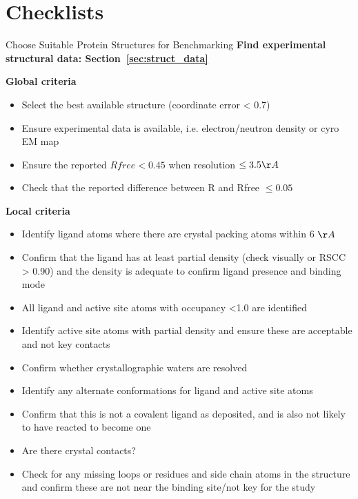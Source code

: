 \documentclass[9pt,bestpractices]{livecoms}
\begin{document}
\section{Checklists}
\label{sec:checklists}

\begin{Checklists*}

\begin{checklist}{Choose Suitable Protein Structures for Benchmarking}
\textbf{Find experimental structural data: Section~\ref{sec:struct_data}}

    \textbf{Global criteria}
    \begin{itemize}
        \item Select the best available structure (coordinate error < 0.7)
        \item Ensure experimental data is available, i.e. electron/neutron density or cyro EM map
        \item Ensure the reported $Rfree < 0.45$ when resolution $\le 3.5 \AA$
        \item Check that the reported difference between R and Rfree $\le 0.05$
        \end{itemize}
    \textbf{Local criteria}
    \begin{itemize}
        \item Identify ligand atoms where there are crystal packing atoms within 6 $\AA$
        \item Confirm that the ligand has at least partial density (check visually or RSCC > 0.90) and the density is adequate to confirm ligand presence and binding mode
        \item All ligand and active site atoms with occupancy <1.0 are identified
        \item Identify active site atoms with partial density and ensure these are acceptable and not key contacts
        \item Confirm whether crystallographic waters are resolved
        \item Identify any alternate conformations for ligand and active site atoms 
        \item Confirm that this is not a covalent ligand as deposited, and is also not likely to have reacted to become one
        \item Are there crystal contacts? 
        \item Check for any missing loops or residues and side chain atoms in the structure and confirm these are not near the binding site/not key for the study

\end{itemize}
\end{checklist}
\end{Checklists*}
\end{document}
